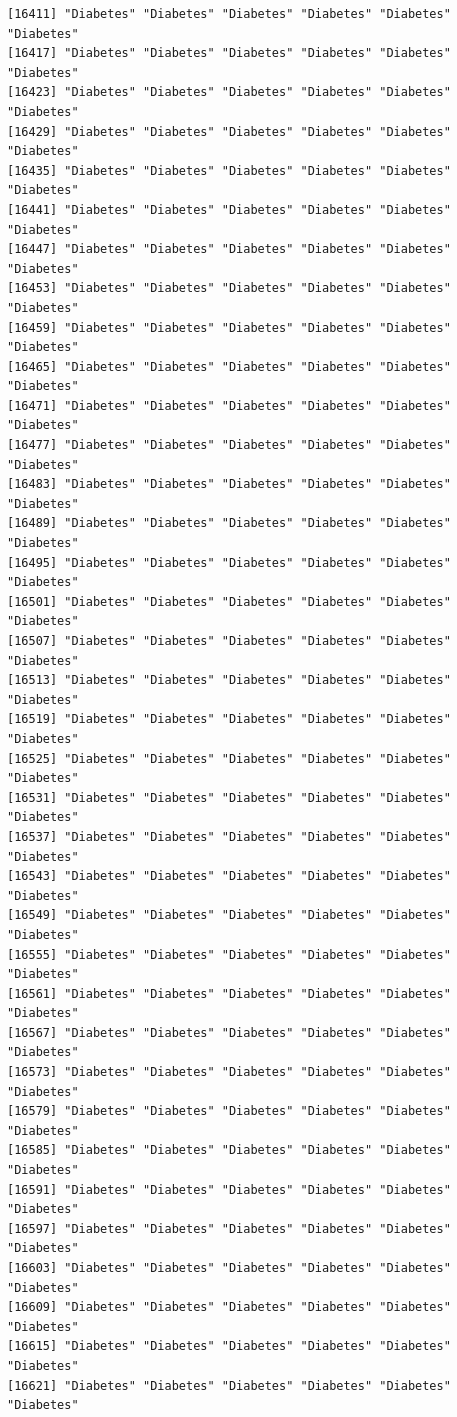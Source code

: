 \documentclass[
  letterpaper,
  DIV=11,
  numbers=noendperiod]{scrartcl}
\begin{document}
\begin{verbatim}
[16411] "Diabetes" "Diabetes" "Diabetes" "Diabetes" "Diabetes" "Diabetes"
[16417] "Diabetes" "Diabetes" "Diabetes" "Diabetes" "Diabetes" "Diabetes"
[16423] "Diabetes" "Diabetes" "Diabetes" "Diabetes" "Diabetes" "Diabetes"
[16429] "Diabetes" "Diabetes" "Diabetes" "Diabetes" "Diabetes" "Diabetes"
[16435] "Diabetes" "Diabetes" "Diabetes" "Diabetes" "Diabetes" "Diabetes"
[16441] "Diabetes" "Diabetes" "Diabetes" "Diabetes" "Diabetes" "Diabetes"
[16447] "Diabetes" "Diabetes" "Diabetes" "Diabetes" "Diabetes" "Diabetes"
[16453] "Diabetes" "Diabetes" "Diabetes" "Diabetes" "Diabetes" "Diabetes"
[16459] "Diabetes" "Diabetes" "Diabetes" "Diabetes" "Diabetes" "Diabetes"
[16465] "Diabetes" "Diabetes" "Diabetes" "Diabetes" "Diabetes" "Diabetes"
[16471] "Diabetes" "Diabetes" "Diabetes" "Diabetes" "Diabetes" "Diabetes"
[16477] "Diabetes" "Diabetes" "Diabetes" "Diabetes" "Diabetes" "Diabetes"
[16483] "Diabetes" "Diabetes" "Diabetes" "Diabetes" "Diabetes" "Diabetes"
[16489] "Diabetes" "Diabetes" "Diabetes" "Diabetes" "Diabetes" "Diabetes"
[16495] "Diabetes" "Diabetes" "Diabetes" "Diabetes" "Diabetes" "Diabetes"
[16501] "Diabetes" "Diabetes" "Diabetes" "Diabetes" "Diabetes" "Diabetes"
[16507] "Diabetes" "Diabetes" "Diabetes" "Diabetes" "Diabetes" "Diabetes"
[16513] "Diabetes" "Diabetes" "Diabetes" "Diabetes" "Diabetes" "Diabetes"
[16519] "Diabetes" "Diabetes" "Diabetes" "Diabetes" "Diabetes" "Diabetes"
[16525] "Diabetes" "Diabetes" "Diabetes" "Diabetes" "Diabetes" "Diabetes"
[16531] "Diabetes" "Diabetes" "Diabetes" "Diabetes" "Diabetes" "Diabetes"
[16537] "Diabetes" "Diabetes" "Diabetes" "Diabetes" "Diabetes" "Diabetes"
[16543] "Diabetes" "Diabetes" "Diabetes" "Diabetes" "Diabetes" "Diabetes"
[16549] "Diabetes" "Diabetes" "Diabetes" "Diabetes" "Diabetes" "Diabetes"
[16555] "Diabetes" "Diabetes" "Diabetes" "Diabetes" "Diabetes" "Diabetes"
[16561] "Diabetes" "Diabetes" "Diabetes" "Diabetes" "Diabetes" "Diabetes"
[16567] "Diabetes" "Diabetes" "Diabetes" "Diabetes" "Diabetes" "Diabetes"
[16573] "Diabetes" "Diabetes" "Diabetes" "Diabetes" "Diabetes" "Diabetes"
[16579] "Diabetes" "Diabetes" "Diabetes" "Diabetes" "Diabetes" "Diabetes"
[16585] "Diabetes" "Diabetes" "Diabetes" "Diabetes" "Diabetes" "Diabetes"
[16591] "Diabetes" "Diabetes" "Diabetes" "Diabetes" "Diabetes" "Diabetes"
[16597] "Diabetes" "Diabetes" "Diabetes" "Diabetes" "Diabetes" "Diabetes"
[16603] "Diabetes" "Diabetes" "Diabetes" "Diabetes" "Diabetes" "Diabetes"
[16609] "Diabetes" "Diabetes" "Diabetes" "Diabetes" "Diabetes" "Diabetes"
[16615] "Diabetes" "Diabetes" "Diabetes" "Diabetes" "Diabetes" "Diabetes"
[16621] "Diabetes" "Diabetes" "Diabetes" "Diabetes" "Diabetes" "Diabetes"

\end{verbatim}
\end{document}
